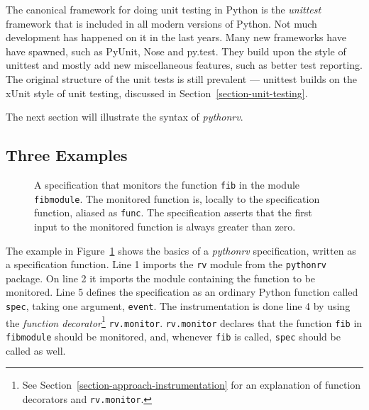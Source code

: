 \documentclass[a4paper,11pt]{kth-mag}
\begin{document}
The canonical framework for doing unit testing in Python is the
\textit{unittest} framework that is included in all modern versions of Python.
Not much development has happened on it in the last years. Many new frameworks
have have spawned, such as PyUnit, Nose and py.test. They build upon the style
of unittest and mostly add new miscellaneous features, such as better test
reporting. The original structure of the unit tests is still prevalent ---
unittest builds on the xUnit style of unit testing, discussed in
Section~\ref{section-unit-testing}.

The next section will illustrate the syntax of \textit{pythonrv}.


\subsection{Three Examples}
\lstset{language=Python,numbers=left}

\begin{figure}[h!]
	\begin{center}
	\begin{minipage}{0.7\textwidth}
	
	\end{minipage}
	\end{center}

	\caption{A specification that monitors the function \texttt{fib} in the
	module \texttt{fibmodule}. The monitored function is, locally to the
specification function, aliased as \texttt{func}. The specification asserts
that the first input to the monitored function is always greater than zero.}
	\label{figure-syntax-example-1}
\end{figure}

The example in Figure~\ref{figure-syntax-example-1} shows the basics of a
\textit{pythonrv} specification, written as a specification function. Line 1
imports the \texttt{rv} module from the \texttt{pythonrv} package. On line 2 it
imports the module containing the function to be monitored. Line 5 defines
the specification as an ordinary Python function called \texttt{spec}, taking
one argument, \texttt{event}. The instrumentation is done line 4 by using the
\textit{function decorator}\footnote{See
Section~\ref{section-approach-instrumentation} for an explanation of function
decorators and \texttt{rv.monitor}.} \texttt{rv.monitor}. \texttt{rv.monitor}
declares that the function \texttt{fib} in \texttt{fibmodule} should be
monitored, and, whenever \texttt{fib} is called, \texttt{spec} should be called
as well.
\end{document}
